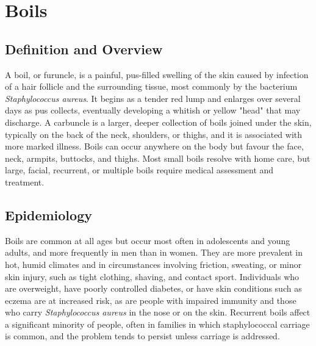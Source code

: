 \chapter{Boils}

\section*{Definition and Overview}
A boil, or furuncle, is a painful, pus-filled swelling of the skin caused by infection of a hair follicle and the surrounding tissue, most commonly by the bacterium \textit{Staphylococcus aureus}. It begins as a tender red lump and enlarges over several days as pus collects, eventually developing a whitish or yellow "head" that may discharge. A carbuncle is a larger, deeper collection of boils joined under the skin, typically on the back of the neck, shoulders, or thighs, and it is associated with more marked illness. Boils can occur anywhere on the body but favour the face, neck, armpits, buttocks, and thighs. Most small boils resolve with home care, but large, facial, recurrent, or multiple boils require medical assessment and treatment.

\section*{Epidemiology}
Boils are common at all ages but occur most often in adolescents and young adults, and more frequently in men than in women. They are more prevalent in hot, humid climates and in circumstances involving friction, sweating, or minor skin injury, such as tight clothing, shaving, and contact sport. Individuals who are overweight, have poorly controlled diabetes, or have skin conditions such as eczema are at increased risk, as are people with impaired immunity and those who carry \textit{Staphylococcus aureus} in the nose or on the skin. Recurrent boils affect a significant minority of people, often in families in which staphylococcal carriage is common, and the problem tends to persist unless carriage is addressed.

